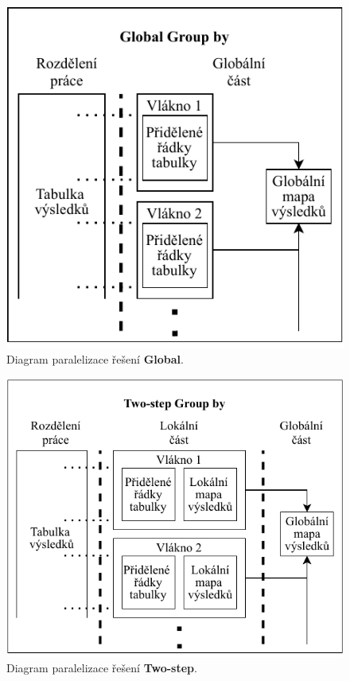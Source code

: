 \begin{figure}[!htp]
\includegraphics{../img/diaGlobalGr.pdf}\centering
\caption{Diagram paralelizace řešení \textbf{Global}.}
\label{figure.diaGlobalGr}
\end{figure}

\begin{figure}[!htp]
\includegraphics{../img/diaTwoGr.pdf}\centering
\caption{Diagram paralelizace řešení \textbf{Two-step}.}
\label{figure.diaTwoGr}
\end{figure}


